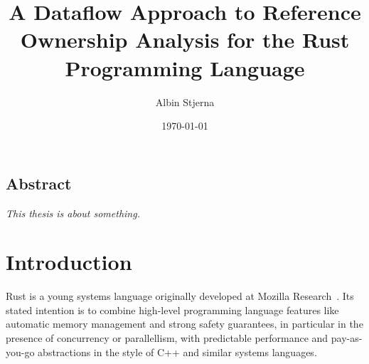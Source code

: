 \documentclass{UUThesisTemplate}
\author{Albin Stjerna}
\date{\today}
\title{A Dataflow Approach to Reference Ownership Analysis for the Rust
  Programming Language}
\newcommand{\fixme}[1] {{\color{red}#1}}
\begin{document}


\maketitle

\section*{Abstract}
\textit{\fixme{This thesis is about something.}}


\begingroup
  \tableofcontents
\endgroup
  

\chapter{Introduction}

Rust is a young systems language originally developed at Mozilla
Research~\cite{matsakis_rust_2014}. Its stated intention is to combine
high-level programming language features like automatic memory management and
strong safety guarantees, in particular in the presence of concurrency or
parallellism, with predictable performance and pay-as-you-go abstractions in the
style of C++ and similar systems languages.
\end{document}
